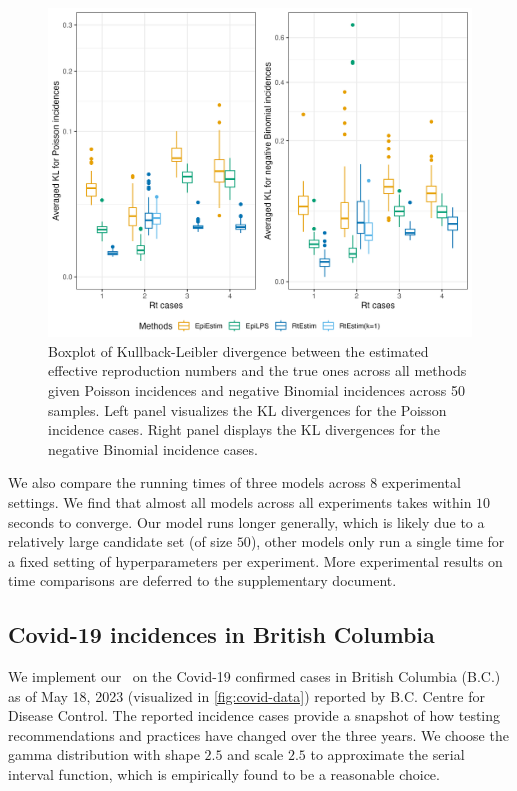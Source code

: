 \begin{figure}[htb]
    \centering
    \includegraphics[width=.9\textwidth]{fig/kl.png}
    \caption{Boxplot of Kullback-Leibler divergence between the estimated effective reproduction numbers and the true ones across all methods given Poisson incidences and negative Binomial incidences across 50 samples. Left panel visualizes the KL divergences for the Poisson incidence cases. Right panel displays the KL divergences for the negative Binomial incidence cases.}%
    \label{fig:kl-res}
\end{figure}

We also compare the running times of three models across $8$ experimental settings. We find that almost all models across all experiments takes within $10$ seconds to converge. Our model runs longer generally, which is likely due to a relatively large candidate set (of size $50$), other models only run a single time for a fixed setting of hyperparameters per experiment. 
More experimental results on time comparisons are deferred to the supplementary document. 


\subsection{Covid-19 incidences in British Columbia}

We implement our \RtEstim\ on the Covid-19 confirmed cases in British Columbia
(B.C.) as of May 18, 2023 (visualized in \autoref{fig:covid-data}) reported by
B.C. Centre for Disease Control. The reported incidence cases provide a snapshot
of how testing recommendations and practices have changed over the three years.
We choose the gamma distribution with shape $2.5$ and scale $2.5$ to approximate
the serial interval function, which is empirically found to be a reasonable
choice. 


